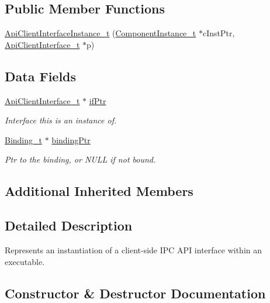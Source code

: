 \subsection*{Public Member Functions}
\begin{DoxyCompactItemize}
\item 
\hyperlink{structmodel_1_1_api_client_interface_instance__t_a9708911ad64a0253f865e45135ccec78}{Api\+Client\+Interface\+Instance\+\_\+t} (\hyperlink{structmodel_1_1_component_instance__t}{Component\+Instance\+\_\+t} $\ast$c\+Inst\+Ptr, \hyperlink{structmodel_1_1_api_client_interface__t}{Api\+Client\+Interface\+\_\+t} $\ast$p)
\end{DoxyCompactItemize}
\subsection*{Data Fields}
\begin{DoxyCompactItemize}
\item 
\hyperlink{structmodel_1_1_api_client_interface__t}{Api\+Client\+Interface\+\_\+t} $\ast$ \hyperlink{structmodel_1_1_api_client_interface_instance__t_a1c1984996de0ea8379654c32c4717bc7}{if\+Ptr}
\begin{DoxyCompactList}\small\item\em Interface this is an instance of. \end{DoxyCompactList}\item 
\hyperlink{structmodel_1_1_binding__t}{Binding\+\_\+t} $\ast$ \hyperlink{structmodel_1_1_api_client_interface_instance__t_a53eea713e4db9d2230118e40af3a0677}{binding\+Ptr}
\begin{DoxyCompactList}\small\item\em Ptr to the binding, or N\+U\+LL if not bound. \end{DoxyCompactList}\end{DoxyCompactItemize}
\subsection*{Additional Inherited Members}


\subsection{Detailed Description}
Represents an instantiation of a client-\/side I\+PC A\+PI interface within an executable. 

\subsection{Constructor \& Destructor Documentation}
